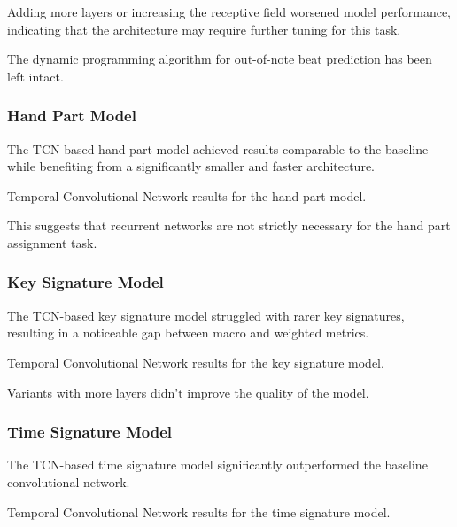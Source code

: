 Adding more layers or increasing the receptive field worsened model performance, indicating that the architecture may require further tuning for this task. 

The dynamic programming algorithm for out-of-note beat prediction has been left intact.

\subsubsection{Hand Part Model}

The TCN-based hand part model achieved results comparable to the baseline while benefiting from a significantly smaller and faster architecture.

\begin{table}[ht!]
\centering

\caption[Temporal Convolutional Network results for the hand part model.]{Temporal Convolutional Network results for the hand part model.}
\label{hand_part_tcn}
\end{table}

This suggests that recurrent networks are not strictly necessary for the hand part assignment task.

\subsubsection{Key Signature Model}

The TCN-based key signature model struggled with rarer key signatures, resulting in a noticeable gap between macro and weighted metrics.

\begin{table}[ht!]
\centering

\caption[Temporal Convolutional Network results for the key signature model.]{Temporal Convolutional Network results for the key signature model.}
\label{key_signature_tcn}
\end{table}

Variants with more layers didn't improve the quality of the model.

\subsubsection{Time Signature Model}

The TCN-based time signature model significantly outperformed the baseline convolutional network.

\begin{table}[ht!]
\centering

\caption[Temporal Convolutional Network results for the time signature model.]{Temporal Convolutional Network results for the time signature model.}
\label{time_signature_tcn}
\end{table}

